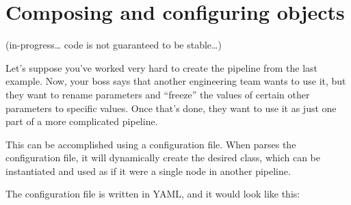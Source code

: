 \documentclass[letterpaper,10pt,english]{sphinxmanual}
\begin{document}
%
\begin{sphinxVerbatim}[commandchars=\\\{\}]
 
     
         

     
             
             
             
\end{sphinxVerbatim}


\section{Composing and configuring  objects}
\label{\detokenize{overview:composing-and-configuring-nanonode-objects}}
(in-progress… code is not guaranteed to be stable…)

Let’s suppose you’ve worked very hard to create the pipeline from the
last example. Now, your boss says that another engineering team wants to
use it, but they want to rename parameters and “freeze” the values of
certain other parameters to specific values. Once that’s done, they want
to use it as just one part of a more complicated 
pipeline.

This can be accomplished using a configuration file. When 
parses the configuration file, it will dynamically create the desired
class, which can be instantiated and used as if it were a single node in
another pipeline.

The configuration file is written in YAML, and it would look like this:

%
\begin{sphinxVerbatim}[commandchars=\\\{\}]
 

    
     
       
       
    
     
     
\end{sphinxVerbatim}
\end{document}
